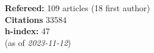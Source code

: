 \textbf{Refereed:} 109 articles (18 first author)\\\textbf{Citations} 33584\\\textbf{h-index:} 47\\(as of \textit{2023-11-12})